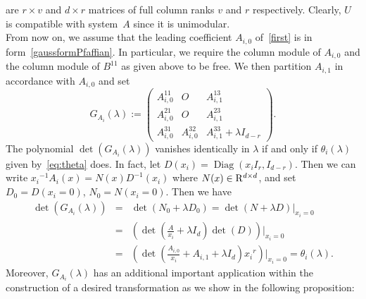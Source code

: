 \documentclass[final,1p,times,number,amsthm]{elsart}
\begin{document}
are $r \times v$ and $d \times r$ matrices of full column ranks $v$ and $r$
respectively. Clearly, $U$ is compatible with
system~$A$ since it is unimodular.\\
From now on, we assume that the leading coefficient $A_{i,0}$ of~\eqref{first}
is in form~\eqref{gaussformPfaffian}. In particular, we require the
column module of $A_{i,0}$ and the column module of $B^{11}$ as given above to
be free. We then partition $A_{i,1}$ in accordance with $A_{i,0}$ and set
\begin{equation}
\label{glambdaformPfaffian} 
G_{A_{i}} (\lambda) := \left(\begin{matrix} A_{i,0}^{11} & O & A_{i,1}^{13}
    \\[5pt] A_{i,0}^{21} & O & A_{i,1}^{23} \\[5pt] A_{i,0}^{31} & A_{i,0}^{32} &
    A_{i,1}^{33}+ \lambda I_{d-r}\end{matrix}\right) .\end{equation}
The polynomial $\det(G_{A_{i}} (\lambda))$ vanishes identically in
$\lambda$ if and only if $\theta_{i} (\lambda)$ given by~\eqref{eq:theta}
does. In fact, let
$D(x_i)= \operatorname{Diag}(x_i I_{r}, I_{d-r})$. Then we can write
${x_i}^{-1} A_i(x) = N(x) D^{-1}(x_i)$ where $N(x) \in {\rm R}^{d \times d}$, and
set $D_0 = D(x_i=0)$, $N_0= N(x_i=0)$. Then we have
\begin{eqnarray*} \det (G_{A_i}(\lambda)) & =& \det (N_0 + \lambda D_0) = \det
(N + \lambda D)|_{x_i=0} \\ & = & (\det(\frac{A}{x_i} + \lambda I_d) \det
(D))|_{x_i=0} \\ &=& (\det (\frac{A_{i,0}}{x_i} + A_{i,1} + \lambda I_d)
{x_i}^{r} )|_{x_i=0} = \theta_{i} (\lambda).  \end{eqnarray*}
Moreover, $G_{A_{i}} (\lambda)$ has an additional important application within the
construction of a desired transformation as we show in the following proposition:
\end{document}
